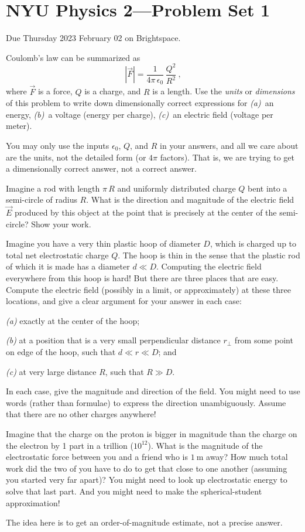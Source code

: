 \documentclass[12pt]{article}
\begin{document}
\section*{NYU Physics 2---Problem Set 1}

Due Thursday 2023 February 02 on Brightspace.

\startproblem%
Coulomb's law can be summarized as
\begin{equation}
  |\vec{F}| = \frac{1}{4\pi\,\epsilon_0}\,\frac{Q^2}{R^2}~,
\end{equation}
where $\vec{F}$ is a force, $Q$ is a charge, and $R$ is a length.
Use the \emph{units} or \emph{dimensions} of this problem to write
down dimensionally correct expressions for
\textsl{(a)}~an energy,
\textsl{(b)}~a voltage (energy per charge),
\textsl{(c)}~an electric field (voltage per meter).

You may only use the inputs $\epsilon_0$, $Q$, and $R$ in your answers, and all
we care about are the units, not the detailed form (or $4\pi$ factors).
That is, we are trying to get a dimensionally correct answer, not a correct answer.

\startproblem%
Imagine a rod with length $\pi\,R$ and uniformly distributed charge
$Q$ bent into a semi-circle of radius $R$.  What is the direction and
magnitude of the electric field $\vec{E}$ produced by this object
at the point that is precisely at the center of the semi-circle?
Show your work.

\startproblem%
Imagine you have a very thin plastic hoop of diameter $D$, which is
charged up to total net electrostatic charge $Q$.
The hoop is thin in the sense that the plastic rod of which it is
made has a diameter $d\ll D$.
Computing the electric field everywhere from this hoop is hard!
But there are three places that are easy.
Compute the electric field (possibly in a limit, or approximately)
at these three locations, and give a clear argument for your answer
in each case:

\textsl{(a)} exactly at the center of the hoop;

\textsl{(b)} at a position that is a very small perpendicular
distance $r_\perp$ from some point on edge of the hoop,
such that $d\ll r\ll D$; and

\textsl{(c)} at very large distance $R$, such that $R\gg D$.

In each case, give the magnitude and direction of the field. You might
need to use words (rather than formulae) to express the direction
unambiguously.
Assume that there are no other charges anywhere!

\startproblem%
Imagine that the charge on the proton is bigger in magnitude than the
charge on the electron by 1 part in a trillion ($10^{12}$).  What is
the magnitude of the electrostatic force between you and a friend who
is $1~\mathrm{m}$ away?  How much total work did the two of you have
to do to get that close to one another (assuming you started very far
apart)? You might need to look up electrostatic energy to solve that last part.
And you might need to make the spherical-student approximation!

The idea here is to get an order-of-magnitude estimate, not a precise answer.
\end{document}
